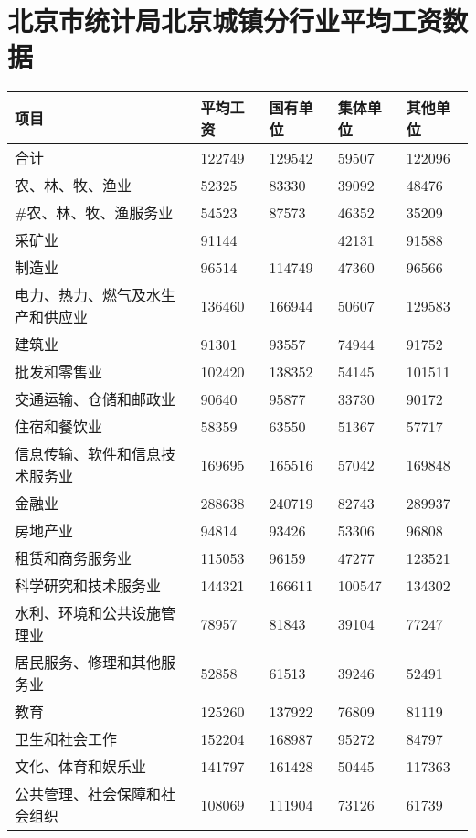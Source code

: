 \documentclass[withoutpreface,bwprint]{cumcmthesis} %
\begin{document}
\section{北京市统计局北京城镇分行业平均工资数据}
\begin{table}[htbp]
  \centering

    \begin{tabular}{|l|l|l|l|l|}
    \toprule
    项目 & 平均工资 & 国有单位 & 集体单位 & 其他单位 \\
    \midrule
    合计 & 122749 & 129542 & 59507 & 122096 \\
    \midrule
    农、林、牧、渔业 & 52325 & 83330 & 39092 & 48476 \\
    \midrule
    \#农、林、牧、渔服务业 & 54523 & 87573 & 46352 & 35209 \\
    \midrule
    采矿业 & 91144 &   & 42131 & 91588 \\
    \midrule
    制造业 & 96514 & 114749 & 47360 & 96566 \\
    \midrule
    电力、热力、燃气及水生产和供应业 & 136460 & 166944 & 50607 & 129583 \\
    \midrule
    建筑业 & 91301 & 93557 & 74944 & 91752 \\
    \midrule
    批发和零售业 & 102420 & 138352 & 54145 & 101511 \\
    \midrule
    交通运输、仓储和邮政业 & 90640 & 95877 & 33730 & 90172 \\
    \midrule
    住宿和餐饮业 & 58359 & 63550 & 51367 & 57717 \\
    \midrule
    信息传输、软件和信息技术服务业 & 169695 & 165516 & 57042 & 169848 \\
    \midrule
    金融业 & 288638 & 240719 & 82743 & 289937 \\
    \midrule
    房地产业 & 94814 & 93426 & 53306 & 96808 \\
    \midrule
    租赁和商务服务业 & 115053 & 96159 & 47277 & 123521 \\
    \midrule
    科学研究和技术服务业 & 144321 & 166611 & 100547 & 134302 \\
    \midrule
    水利、环境和公共设施管理业 & 78957 & 81843 & 39104 & 77247 \\
    \midrule
    居民服务、修理和其他服务业 & 52858 & 61513 & 39246 & 52491 \\
    \midrule
    教育 & 125260 & 137922 & 76809 & 81119 \\
    \midrule
    卫生和社会工作 & 152204 & 168987 & 95272 & 84797 \\
    \midrule
    文化、体育和娱乐业 & 141797 & 161428 & 50445 & 117363 \\
    \midrule
    公共管理、社会保障和社会组织 & 108069 & 111904 & 73126 & 61739 \\
    \bottomrule
    \end{tabular}%
\label{tab:北京市统计局北京城镇分行业平均工资数据}%
\end{table}%
\end{document}
